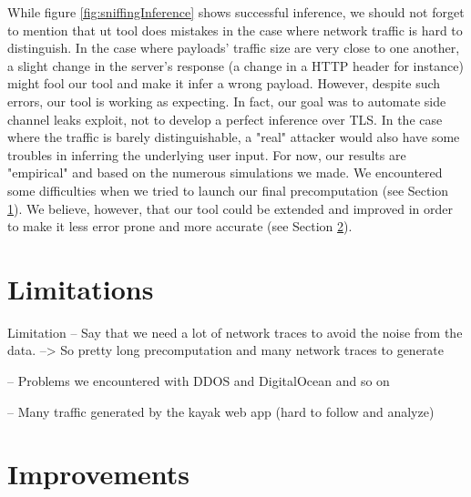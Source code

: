 \documentclass[journal]{IEEEtran}
\begin{document}
\medskip

While figure \ref{fig:sniffingInference} shows successful inference, we should not forget to mention that ut tool does mistakes in the case where network traffic is hard to distinguish. In the case where payloads' traffic size are very close to one another, a slight change in the server's response (a change in a HTTP header for instance) might fool our tool and make it infer a wrong payload. However, despite such errors, our tool is working as expecting. In fact, our goal was to automate side channel leaks exploit, not to develop a perfect inference over TLS. In the case where the traffic is barely distinguishable, a "real" attacker would also have some troubles in inferring the underlying user input. For now, our results are "empirical" and based on the numerous simulations we made. We encountered some difficulties when we tried to launch our final precomputation (see Section  \ref{sect:Limitations}). We believe, however, that our tool could be extended and improved in order to make it less error prone and more accurate (see Section \ref{sect:Improvements}).


\section{Limitations}
\label{sect:Limitations}

Limitation -- Say that we need a lot of network traces to avoid the noise from the data. --> So pretty long precomputation  and many network traces to generate

-- Problems we encountered with DDOS and DigitalOcean and so on

-- Many traffic generated by the kayak web app (hard to follow and analyze)

\section{Improvements}
\label{sect:Improvements}
\end{document}
